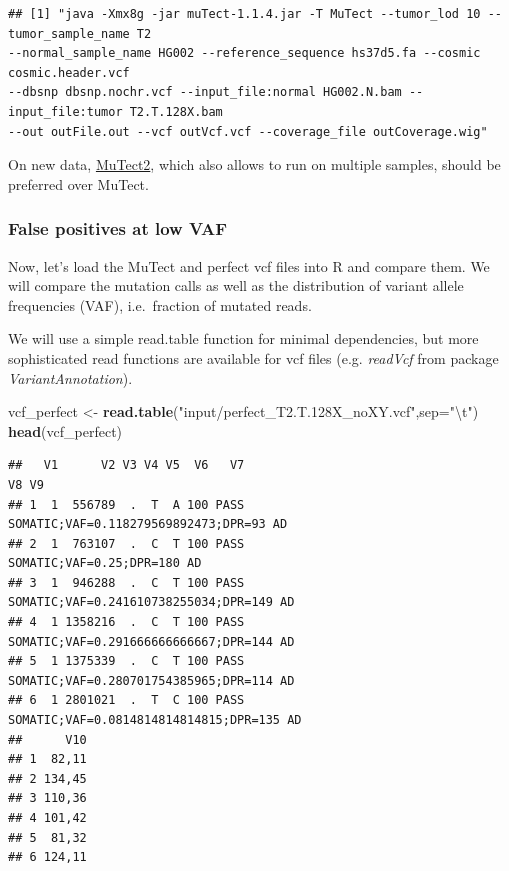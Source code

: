 \documentclass[]{article}
\newenvironment{Shaded}{\begin{snugshade}}{\end{snugshade}}
\newcommand{\CharTok}[1]{\textcolor[rgb]{0.31,0.60,0.02}{#1}}
\newcommand{\DataTypeTok}[1]{\textcolor[rgb]{0.13,0.29,0.53}{#1}}
\newcommand{\KeywordTok}[1]{\textcolor[rgb]{0.13,0.29,0.53}{\textbf{#1}}}
\newcommand{\NormalTok}[1]{#1}
\newcommand{\StringTok}[1]{\textcolor[rgb]{0.31,0.60,0.02}{#1}}
\begin{document}
\begin{verbatim}
## [1] "java -Xmx8g -jar muTect-1.1.4.jar -T MuTect --tumor_lod 10 --tumor_sample_name T2
--normal_sample_name HG002 --reference_sequence hs37d5.fa --cosmic cosmic.header.vcf
--dbsnp dbsnp.nochr.vcf --input_file:normal HG002.N.bam --input_file:tumor T2.T.128X.bam
--out outFile.out --vcf outVcf.vcf --coverage_file outCoverage.wig"
\end{verbatim}

On new data,
\href{https://gatk.broadinstitute.org/hc/en-us/articles/360037593851-Mutect2}{MuTect2},
which also allows to run on multiple samples, should be preferred over
MuTect.

\hypertarget{false-positives-at-low-vaf}{%
\subsubsection{False positives at low
VAF}\label{false-positives-at-low-vaf}}

Now, let's load the MuTect and perfect vcf files into R and compare
them. We will compare the mutation calls as well as the distribution of
variant allele frequencies (VAF), i.e.~fraction of mutated reads.

We will use a simple read.table function for minimal dependencies, but
more sophisticated read functions are available for vcf files (e.g.
\emph{readVcf} from package \emph{VariantAnnotation}).

\begin{Shaded}
\begin{Highlighting}[]
\NormalTok{vcf_perfect <-}\StringTok{ }\KeywordTok{read.table}\NormalTok{(}\StringTok{"input/perfect_T2.T.128X_noXY.vcf"}\NormalTok{,}\DataTypeTok{sep=}\StringTok{"}\CharTok{\textbackslash{}t}\StringTok{"}\NormalTok{)}
\KeywordTok{head}\NormalTok{(vcf_perfect)}
\end{Highlighting}
\end{Shaded}

\begin{verbatim}
##   V1      V2 V3 V4 V5  V6   V7                                     V8 V9
## 1  1  556789  .  T  A 100 PASS   SOMATIC;VAF=0.118279569892473;DPR=93 AD
## 2  1  763107  .  C  T 100 PASS               SOMATIC;VAF=0.25;DPR=180 AD
## 3  1  946288  .  C  T 100 PASS  SOMATIC;VAF=0.241610738255034;DPR=149 AD
## 4  1 1358216  .  C  T 100 PASS  SOMATIC;VAF=0.291666666666667;DPR=144 AD
## 5  1 1375339  .  C  T 100 PASS  SOMATIC;VAF=0.280701754385965;DPR=114 AD
## 6  1 2801021  .  T  C 100 PASS SOMATIC;VAF=0.0814814814814815;DPR=135 AD
##      V10
## 1  82,11
## 2 134,45
## 3 110,36
## 4 101,42
## 5  81,32
## 6 124,11
\end{verbatim}
\end{document}
